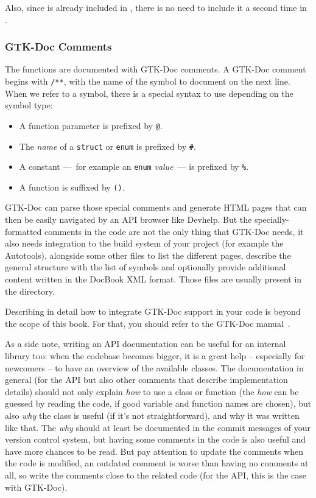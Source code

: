 Also, since  is already included in , there is no need to include it a second time in .

\subsubsection{GTK-Doc Comments}
The functions are documented with GTK-Doc comments. A GTK-Doc comment begins with \lstinline{/**}, with the name of the symbol to document on the next line. When we refer to a symbol, there is a special syntax to use depending on the symbol type:
\begin{itemize}
  \item A function parameter is prefixed by \lstinline{@}.
  \item The \emph{name} of a \lstinline{struct} or \lstinline{enum} is prefixed by \lstinline{#}.
  \item A constant ---~for example an \lstinline{enum} \emph{value}~--- is prefixed by \lstinline{%}.
  \item A function is suffixed by \lstinline{()}.
\end{itemize}

GTK-Doc can parse those special comments and generate HTML pages that can then be easily navigated by an API browser like Devhelp. But the specially-formatted comments in the code are not the only thing that GTK-Doc needs, it also needs integration to the build system of your project (for example the Autotools), alongside some other files to list the different pages, describe the general structure with the list of symbols and optionally provide additional content written in the DocBook XML format. Those files are usually present in the  directory.

Describing in detail how to integrate GTK-Doc support in your code is beyond the scope of this book. For that, you should refer to the GTK-Doc manual~\cite{gtk-doc}.

As a side note, writing an API documentation can be useful for an internal library too: when the codebase becomes bigger, it is a great help -- especially for newcomers -- to have an overview of the available classes. The documentation in general (for the API but also other comments that describe implementation details) should not only explain \emph{how} to use a class or function (the \emph{how} can be guessed by reading the code, if good variable and function names are chosen), but also \emph{why} the class is useful (if it's not straightforward), and why it was written like that. The \emph{why} should at least be documented in the commit messages of your version control system, but having some comments in the code is also useful and have more chances to be read. But pay attention to update the comments when the code is modified, an outdated comment is worse than having no comments at all, so write the comments close to the related code (for the API, this is the case with GTK-Doc).

